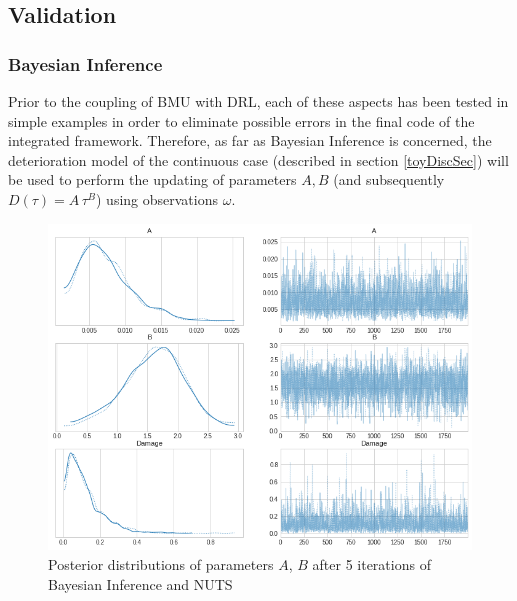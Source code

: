 \newpage


\subsection{Validation}


\subsubsection{Bayesian Inference}

Prior to the coupling of \gls{BMU} with \gls{DRL}, each of these aspects has been tested in simple examples in order to eliminate possible errors in the final code of the integrated framework. Therefore, as far as Bayesian Inference is concerned, the deterioration model of the continuous case (described in section \ref{toyDiscSec}) will be used to perform the updating of parameters $A, B$ (and subsequently $D(\tau) = A \, \tau^B$) using observations $\omega$. 

\begin{figure}[H]
    \centering
	\includegraphics[width=\linewidth]{Figures/bayesianInferenceV3.png}
	\caption{Posterior distributions of parameters $A$, $B$ after 5 iterations of Bayesian Inference and \gls{NUTS}}
	\label{bayesInfno5}
\end{figure}

